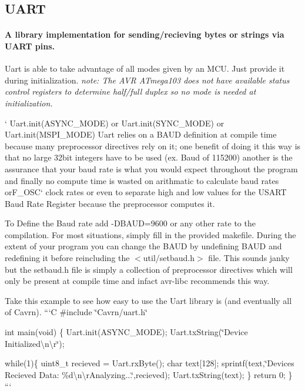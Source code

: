  \subsection*{U\+A\+R\+T}

\paragraph*{A library implementation for sending/recieving bytes or strings via U\+A\+R\+T pins.}

Uart is able to take advantage of all modes given by an M\+C\+U. Just provide it during initialization. {\itshape note\+: The A\+V\+R A\+Tmega103 does not have available status control registers to determine half/full duplex so no mode is needed at initialization.}

` Uart.\+init(\+A\+S\+Y\+N\+C\+\_\+\+M\+O\+D\+E) or Uart.\+init(\+S\+Y\+N\+C\+\_\+\+M\+O\+D\+E) or Uart.\+init(\+M\+S\+P\+I\+\_\+\+M\+O\+D\+E) {\ttfamily  Uart relies on a B\+A\+U\+D definition at compile time because many preprocessor directives rely on it; one benefit of doing it this way is that no large 32bit integers have to be used (ex. Baud of 115200) another is the assurance that your baud rate is what you would expect throughout the program and finally no compute time is wasted on arithmatic to calculate baud rates or}F\+\_\+\+O\+S\+C` clock rates or even to separate high and low values for the U\+S\+A\+R\+T Baud Rate Register because the preprocessor computes it.

To Define the Baud rate add -\/\+D\+B\+A\+U\+D=9600 or any other rate to the compilation. For most situations, simply fill in the provided makefile. During the extent of your program you can change the B\+A\+U\+D by undefining B\+A\+U\+D and redefining it before reincluding the $<$util/setbaud.\+h$>$ file. This sounds janky but the setbaud.\+h file is simply a collection of preprocessor directives which will only be present at compile time and infact avr-\/libc recommends this way.

Take this example to see how easy to use the Uart library is (and eventually all of Cavrn). ```\+C \#include \char`\"{}\+Cavrn/uart.\+h\char`\"{}

int main(void) \{ Uart.\+init(\+A\+S\+Y\+N\+C\+\_\+\+M\+O\+D\+E); Uart.\+tx\+String(\char`\"{}\+Device Initialized\textbackslash{}n\textbackslash{}r\char`\"{});

while(1)\{ uint8\+\_\+t recieved = Uart.\+rx\+Byte(); char text\mbox{[}128\mbox{]}; sprintf(text,\char`\"{}\+Devices Recieved Data\+: \%d\textbackslash{}n\textbackslash{}r\+Analyzing...\char`\"{},recieved); Uart.\+tx\+String(text); \} return 0; \} ``` 

